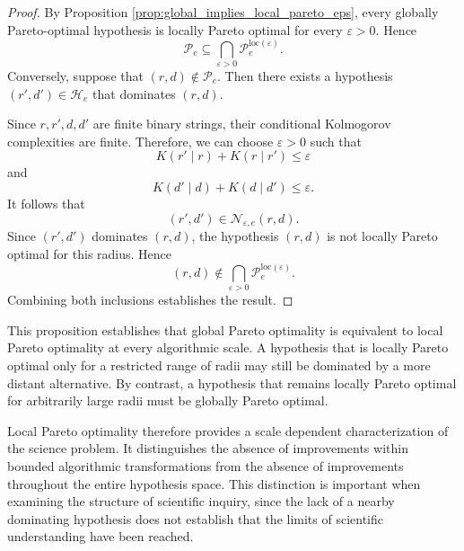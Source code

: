 \begin{proof}
By Proposition \ref{prop:global_implies_local_pareto_eps}, every globally Pareto-optimal hypothesis is locally
Pareto optimal for every $\varepsilon>0$. Hence
\[
\mathcal P_e \subseteq \bigcap_{\varepsilon>0} \mathcal P^{\mathrm{loc}(\varepsilon)}_e.
\]
Conversely, suppose that $(r,d)\notin\mathcal P_e$. Then there exists a hypothesis $(r',d')\in\mathcal H_e$ that dominates $(r,d)$.

Since $r,r',d,d'$ are finite binary strings, their conditional Kolmogorov complexities are finite. Therefore, we can choose $\varepsilon>0$ such that
\[
K(r'\mid r)+K(r\mid r')\leq\varepsilon
\]
and
\[
K(d'\mid d)+K(d\mid d')\leq\varepsilon.
\]
It follows that
\[
(r',d')\in\mathcal N_{\varepsilon,e}(r,d).
\]
Since $(r',d')$ dominates $(r,d)$, the hypothesis $(r,d)$ is not locally Pareto optimal for this radius. Hence
\[
(r,d)\notin
\bigcap_{\varepsilon>0} \mathcal P^{\mathrm{loc}(\varepsilon)}_e.
\]
Combining both inclusions establishes the result.
\end{proof}

This proposition establishes that global Pareto optimality is equivalent to local Pareto optimality at every algorithmic scale. A hypothesis that is locally Pareto optimal only for a restricted range of radii may still be dominated by a more distant alternative. By contrast, a hypothesis that remains locally Pareto optimal for arbitrarily large radii must be globally Pareto optimal.

Local Pareto optimality therefore provides a scale dependent characterization of the science problem. It distinguishes the absence of improvements within bounded algorithmic transformations from the absence of improvements throughout the entire hypothesis space. This distinction is important when examining the structure of scientific inquiry, since the lack of a nearby dominating hypothesis does not establish that the limits of scientific understanding have been reached.

%
%



